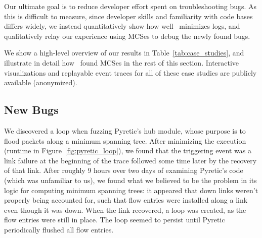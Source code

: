 Our ultimate goal is to reduce developer effort spent on troubleshooting bugs.
As this is difficult to measure, since developer skills and
familiarity with code bases differs widely, we instead
quantitatively show how well \projectname~minimizes logs,
and qualitatively relay our experience using MCSes to debug the newly found bugs.


We show a high-level overview
of our results in Table~\ref{tab:case_studies}, and
illustrate in detail how \projectname~found MCSes
in the rest of this section. Interactive visualizations and replayable event traces
for all of these case studies are publicly available (anonymized).

\subsection{New Bugs}

 We discovered a loop when fuzzing Pyretic's hub
module, whose purpose is to flood packets along a minimum spanning tree. After
minimizing the execution (runtime in Figure~\ref{fig:pyretic_loop}), we found that the triggering event
was a link failure at the beginning of the trace followed some time later by
the recovery of that link. After roughly 9 hours over two days of examining
Pyretic's code (which was unfamiliar to us), we found what we believed to be the problem
in its logic for computing minimum spanning trees: it appeared that down links
weren't properly being accounted for, such that flow entries were installed
along a link even though it was down. When the link recovered, a loop was
created, as the flow entries were still in place. The loop seemed to persist until
Pyretic periodically flushed all flow entries.

